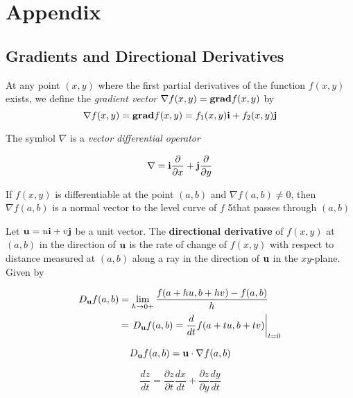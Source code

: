 \chapter{Appendix}
\section{Gradients and Directional Derivatives}
\begin{dfn} [Gradient]
At any point $(x, y)$ where the first partial derivatives of the function
$f(x,y)$ exists, we define the \emph{gradient vector} $\nabla f(x,y) = \mathbf{grad}{f(x,y)}$ by 
\begin{equation}
    \nabla f(x,y) = \mathbf{grad}{f(x,y)} = f_1(x,y)\mathbf{i} + f_2(x,y) \mathbf{j}
\end{equation}

The symbol $\nabla$ is a \emph{vector differential operator}

\begin{equation}
    \nabla = \mathbf{i} \frac{\partial}{\partial x} + \mathbf{j}
    \frac{\partial}{\partial y}
\end{equation}
\end{dfn}

\begin{thm}
If $f(x,y)$ is differentiable at the point $(a,b)$ and $\nabla f(a,b) \neq
0$, then $\nabla f(a,b)$ is a normal vector to the level curve of $f$
5that passes through $(a,b)$
\end{thm}

\begin{dfn} 
    Let $\mathbf{u} = u \mathbf{i} + v \mathbf{j}$ be a unit vector. The \textbf{directional
    derivative} of $f(x,y)$ at $(a,b)$ in the direction of $\mathbf{u}$ is the
    rate of change of $f(x,y)$ with respect to distance measured at
    $(a,b)$ along a ray in the direction of $\mathbf{u}$ in the $xy$-plane. Given
    by 

    \begin{align}
        D_{\mathbf{u}} f(a,b) &= \lim_{h\rightarrow 0+} \frac{f(a+hu, b+hv) -
        f(a,b)}{h} \\
        &= \left. D_{\mathbf{u}}f(a,b) = \frac{d}{dt} f(a+tu, b+tv) \right|_{t=0}
    \end{align}
\end{dfn}

\begin{thm}
    \begin{equation}
        D_{\mathbf{u}}f(a,b) = \mathbf{u} \cdot \nabla f(a,b)
    \end{equation}
\end{thm}

\begin{dfn} 
    \begin{equation}
        \frac{dz}{dt} = \frac{\partial{z}}{\partial{t}} \frac{dx}{dt} +
        \frac{\partial{z}}{\partial{y}}\frac{dy}{dt}
    \end{equation}
\end{dfn}
    
